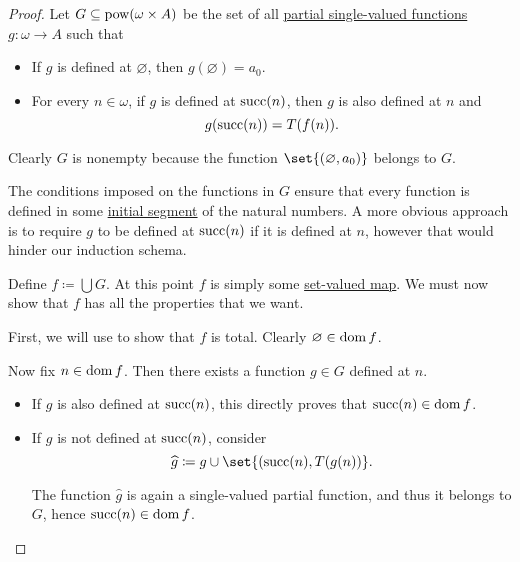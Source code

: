 \begin{proof}
  Let \( G \subseteq \operatorname{pow}(\omega \times A) \) be the set of all \hyperref[def:set_valued_map/partial]{partial single-valued functions} \( g: \omega \to A \) such that
  \begin{itemize}
    \item If \( g \) is defined at \( \varnothing \), then \( g(\varnothing) = a_0 \).
    \item For every \( n \in \omega \), if \( g \) is defined at \( \operatorname{succ}(n) \), then \( g \) is also defined at \( n \) and
    \begin{equation*}
      g(\operatorname{succ}(n)) = T(f(n)).
    \end{equation*}
  \end{itemize}

  Clearly \( G \) is nonempty because the function \( \set{ (\varnothing, a_0) } \) belongs to \( G \).

  The conditions imposed on the functions in \( G \) ensure that every function is defined in some \hyperref[def:order_interval/unbounded]{initial segment} of the natural numbers. A more obvious approach is to require \( g \) to be defined at \( \operatorname{succ}(n) \) if it is defined at \( n \), however that would hinder our induction schema.

  Define \( f \coloneqq \bigcup G \). At this point \( f \) is simply some \hyperref[def:function]{set-valued map}. We must now show that \( f \) has all the properties that we want.

   First, we will use  to show that \( f \) is total. Clearly \( \varnothing \in \operatorname{dom} f \).

  Now fix \( n \in \operatorname{dom} f \). Then there exists a function \( g \in G \) defined at \( n \).

  \begin{itemize}
    \item If \( g \) is also defined at \( \operatorname{succ}(n) \), this directly proves that \( \operatorname{succ}(n) \in \operatorname{dom} f \).
    \item If \( g \) is not defined at \( \operatorname{succ}(n) \), consider
    \begin{equation*}
      \widehat g \coloneqq g \cup \set{ (\op{succ}(n), T(g(n)) }.
    \end{equation*}

    The function \( \widehat g \) is again a single-valued partial function, and thus it belongs to \( G \), hence \( \operatorname{succ}(n) \in \operatorname{dom} f \).
  \end{itemize}


\end{proof}

